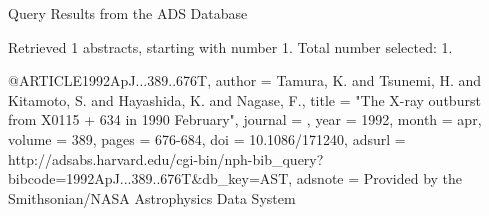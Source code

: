 Query Results from the ADS Database


Retrieved 1 abstracts, starting with number 1.  Total number selected: 1.

@ARTICLE{1992ApJ...389..676T,
   author = {{Tamura}, K. and {Tsunemi}, H. and {Kitamoto}, S. and {Hayashida}, K. and 
	{Nagase}, F.},
    title = "{The X-ray outburst from X0115 + 634 in 1990 February}",
  journal = {\apj},
     year = 1992,
    month = apr,
   volume = 389,
    pages = {676-684},
      doi = {10.1086/171240},
   adsurl = {http://adsabs.harvard.edu/cgi-bin/nph-bib_query?bibcode=1992ApJ...389..676T&db_key=AST},
  adsnote = {Provided by the Smithsonian/NASA Astrophysics Data System}
}


